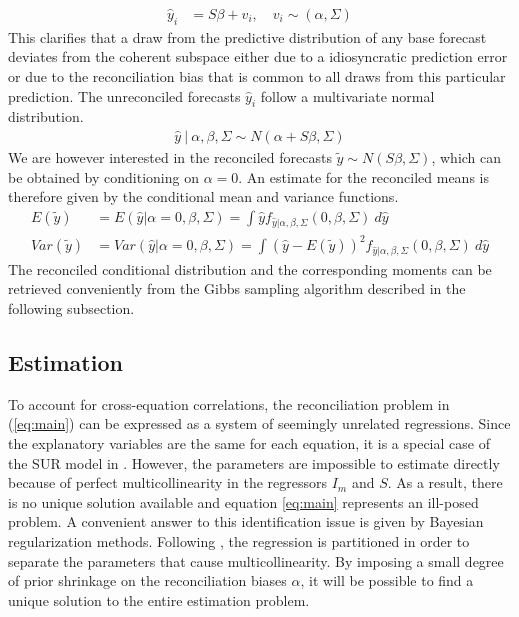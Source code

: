 \documentclass[a4paper,fleqn,11pt]{article}
\begin{document}
\begin{align}
	\hat{y}_i &=  S\beta + v_i, \quad v_i \sim (\alpha,\Sigma)
\end{align}
This clarifies that a draw from the predictive distribution of any base forecast deviates from the coherent subspace either due to a idiosyncratic prediction error or due to the reconciliation bias that is common to all draws from this particular prediction. The unreconciled forecasts $\hat{y}_{i}$ follow a multivariate normal distribution.
\begin{align}
\hat{y}\ |\ \alpha,\beta,\Sigma \sim N(\alpha + S\beta,\Sigma)
\end{align}
We are however interested in the reconciled forecasts $\tilde{y} \sim N(S\beta,\Sigma)$, which can be obtained by conditioning on $\alpha = 0$. An estimate for the reconciled means is therefore given by the conditional mean and variance functions.
\begin{align*}
E(\tilde{y}) &= E(\hat{y}|\alpha = 0,\beta,\Sigma) = \int \hat{y} f_{\hat{y}|\alpha,\beta,\Sigma}(0,\beta,\Sigma)\ d\hat{y} \\
Var(\tilde{y}) &= Var(\hat{y}|\alpha = 0,\beta,\Sigma) =  \int (\hat{y} - E(\tilde{y}))^2 f_{\hat{y}|\alpha,\beta,\Sigma}(0,\beta,\Sigma)\ d\hat{y}
\end{align*}
The reconciled conditional distribution and the corresponding moments can be retrieved conveniently from the Gibbs sampling algorithm described in the following subsection.\\

\subsection{Estimation}
To account for cross-equation correlations, the reconciliation problem in (\ref{eq:main}) can be expressed as a system of seemingly unrelated regressions. Since the explanatory variables are the same for each equation, it is a special case of the SUR model in \cite{Zellner1962}. However, the parameters are impossible to estimate directly because of perfect multicollinearity in the regressors $I_m$ and $S$. As a result, there is no unique solution available and equation \ref{eq:main} represents an ill-posed problem. A convenient answer to this identification issue is given by Bayesian regularization methods. Following \cite{Farebrother1978}, the regression is partitioned in order to separate the parameters that cause multicollinearity. By imposing a small degree of prior shrinkage on the reconciliation biases $\alpha$, it will be possible to find a unique solution to the entire estimation problem.\\
\end{document}
